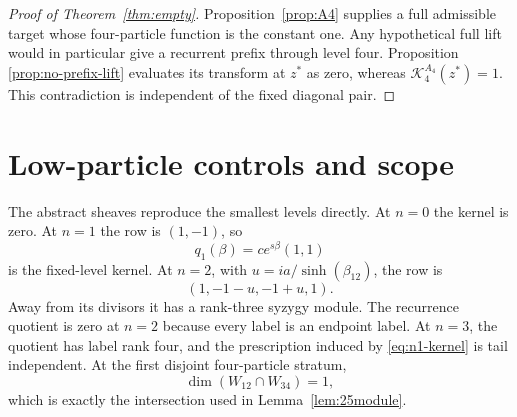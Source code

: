 \documentclass[11pt,reqno]{amsart}
\theoremstyle{definition}
\theoremstyle{remark}
\newcommand{\cK}{\mathcal K}
\begin{document}
\begin{proof}[Proof of Theorem~\ref{thm:empty}]
Proposition~\ref{prop:A4} supplies a full admissible target whose
four-particle function is the constant one.  Any hypothetical full lift would
in particular give a recurrent prefix through level four.  Proposition
\ref{prop:no-prefix-lift} evaluates its transform at $z^*$ as zero, whereas
$\cK_4^{A_4}(z^*)=1$.  This contradiction is independent of the fixed
diagonal pair.
\end{proof}

\section{Low-particle controls and scope}
\label{sec:scope}

The abstract sheaves reproduce the smallest levels directly.  At $n=0$ the
kernel is zero.  At $n=1$ the row is $(1,-1)$, so
\begin{equation}
 q_1(\beta)=c e^{s\beta}(1,1)
 \label{eq:n1-kernel}
\end{equation}
is the fixed-level kernel.  At $n=2$, with
$u=ia/\sinh(\beta_{12})$, the row is
\begin{equation}
 (1,-1-u,-1+u,1).
 \label{eq:T2-general}
\end{equation}
Away from its divisors it has a rank-three syzygy module.  The recurrence
quotient is zero at $n=2$ because every label is an endpoint label.  At
$n=3$, the quotient has label rank four, and the prescription induced by
\eqref{eq:n1-kernel} is tail independent.  At the first disjoint
four-particle stratum,
\begin{equation}
 \dim(W_{12}\cap W_{34})=1,
\end{equation}
which is exactly the intersection used in Lemma~\ref{lem:25module}.
\end{document}

